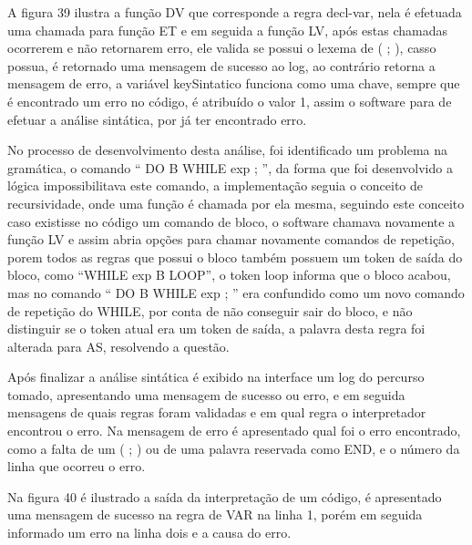 \documentclass[12pt,oneside,a4paper,chapter=TITLE,section=TITLE,sumario=tradicional]{abntex2}
\begin{document}
A figura 39 ilustra a função DV que corresponde a regra decl-var, nela é efetuada uma chamada para função ET e em seguida a função LV, após estas chamadas ocorrerem e não retornarem erro, ele valida se possui o lexema de ( ; ), casso possua, é retornado uma mensagem de sucesso ao log, ao contrário retorna a mensagem de erro, a variável keySintatico funciona como uma chave, sempre que é encontrado um erro no código, é atribuído o valor 1, assim o software para de efetuar a análise sintática, por já ter encontrado erro. 

\begin{figure}[htb]
\end{figure} 

No processo de desenvolvimento desta análise, foi identificado um problema na gramática, o comando “ DO B WHILE exp ; ”, da forma que foi desenvolvido a lógica impossibilitava este comando, a implementação seguia o conceito de recursividade, onde uma função é chamada por ela mesma, seguindo este conceito caso existisse no código um comando de bloco, o software chamava novamente a função LV e assim abria opções para chamar novamente comandos de repetição, porem todos as regras que possui o bloco também possuem um token de saída do bloco, como “WHILE exp B LOOP”, o token loop informa que o bloco acabou, mas no comando “ DO B WHILE exp ; ” era confundido como um novo comando de repetição do WHILE, por conta de não conseguir sair do bloco, e não distinguir se o token atual era um token de saída, a palavra desta regra foi alterada para AS, resolvendo a questão.

Após finalizar a análise sintática é exibido na interface um log do percurso tomado, apresentando uma mensagem de sucesso ou erro, e em seguida mensagens de quais regras foram validadas e em qual regra o interpretador encontrou o erro.  Na mensagem de erro é apresentado qual foi o erro encontrado, como a falta de um ( ; ) ou de uma palavra reservada como END, e o número da linha que ocorreu o erro.

Na figura 40 é ilustrado a saída da interpretação de um código, é apresentado uma mensagem de sucesso na regra de VAR na linha 1, porém em seguida informado um erro na linha dois e a causa do erro.

\begin{figure}[htb]
\end{figure} 
\end{document}
